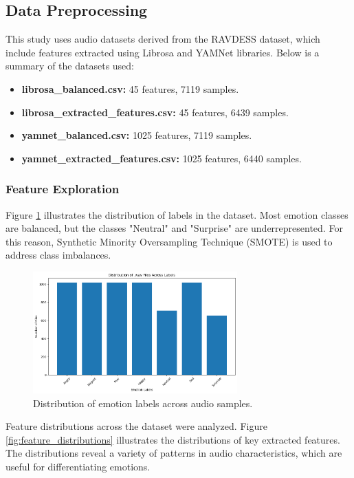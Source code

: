 \documentclass{article}
\begin{document}
\subsection{Data Preprocessing}
This study uses audio datasets derived from the RAVDESS dataset, which include features extracted using Librosa 
and YAMNet libraries. Below is a summary of the datasets used:

\begin{itemize}
    \item \textbf{librosa\_balanced.csv:} 45 features, 7119 samples.
    \item \textbf{librosa\_extracted\_features.csv:} 45 features, 6439 samples.
    \item \textbf{yamnet\_balanced.csv:} 1025 features, 7119 samples.
    \item \textbf{yamnet\_extracted\_features.csv:} 1025 features, 6440 samples.
\end{itemize}

\subsubsection*{Feature Exploration}

Figure \ref{fig:label_distribution} illustrates the distribution of labels in the dataset. Most emotion classes 
are balanced, but the classes "Neutral" and "Surprise" are underrepresented. For this reason, Synthetic Minority 
Oversampling Technique (SMOTE) is used to address class imbalances.

\begin{figure}[!h]
    \centering
    \includegraphics[width=0.7\textwidth]{../assets/label_distribution.png}
    \caption{Distribution of emotion labels across audio samples.}
    \label{fig:label_distribution}
\end{figure}

Feature distributions across the dataset were analyzed. Figure \ref{fig:feature_distributions} illustrates the 
distributions of key extracted features. The distributions reveal a variety of patterns in audio characteristics, 
which are useful for differentiating emotions.
\end{document}
